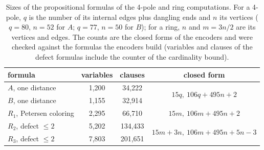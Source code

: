 \begin{table}[t]\centering\small
\begin{tabular}{lccc}
\toprule
formula & variables & clauses & closed form \\
\midrule
$A$, one distance & 1{,}200 & 34{,}222 & \multirow{2}{*}{$15 q,\ 106 q + 495 n + 2$} \\
$B$, one distance & 1{,}155 & 32{,}914 & \\
$R_1$, Petersen coloring & 2{,}295 & 66{,}710 & $15 m,\ 106 m + 495 n + 2$ \\
$R_2$, defect $\le 2$ & 5{,}202 & 134{,}433 & \multirow{2}{*}{$15 m + 3n,\ 106 m + 495 n + 5n - 3$} \\
$R_3$, defect $\le 2$ & 7{,}803 & 201{,}651 & \\
\bottomrule
\end{tabular}
\caption{Sizes of the propositional formulas of the 4-pole and ring computations. For a 4-pole, $q$ is the number of its internal edges plus dangling ends and $n$ its vertices ($q = 80$, $n = 52$ for $A$; $q = 77$, $n = 50$ for $B$); for a ring, $n$ and $m = 3n/2$ are its vertices and edges. The counts are the closed forms of the encoders and were checked against the formulas the encoders build (variables and clauses of the defect formulas include the counter of the cardinality bound).}\label{tab:sizes}
\end{table}
